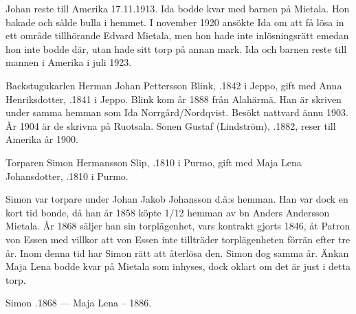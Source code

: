 Johan reste till Amerika 17.11.1913. Ida bodde kvar med barnen på Mietala. Hon bakade och sålde bulla i hemmet. I november 1920 ansökte Ida om att få lösa in ett område tillhörande Edvard Mietala, men hon hade inte inlösningsrätt emedan hon inte bodde där, utan hade sitt torp på annan mark. Ida och barnen reste till mannen i Amerika i juli 1923.


Backstugukarlen Herman Johan Pettersson Blink, .1842 i Jeppo, gift med Anna Henriksdotter, .1841 i Jeppo. Blink kom år 1888 från Alahärmä. Han är skriven under samma hemman som Ida Norrgård/Nordqvist. Besökt nattvard ännu 1903. År 1904 är de skrivna på Ruotsala. Sonen Gustaf (Lindström), .1882, reser till Amerika år 1900.


Torparen Simon Hermansson Slip, .1810 i Purmo, gift med Maja Lena Johansdotter, .1810 i Purmo.
\begin{jhchildren}
  \item {}
  \item {}
  \item {}
  \item {}
  \item {}
  \item {}
\end{jhchildren}

Simon var torpare under Johan Jakob Johansson d.ä:s hemman. Han var dock en kort tid bonde, då han år 1858 köpte 1/12 hemman av bn Anders Andersson Mietala. År 1868 säljer han sin torplägenhet, vars kontrakt gjorts 1846, åt Patron von Essen med villkor att von Essen inte tillträder torplägenheten förrän efter tre år. Inom denna tid har Simon rätt att återlösa den. Simon dog samma år. Änkan Maja Lena bodde kvar på Mietala som inhyses, dock oklart om det är just i detta torp.

Simon .1868  ---  Maja Lena  – 1886.



